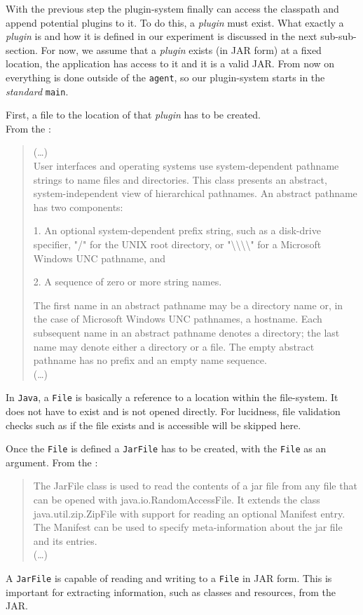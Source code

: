 With the previous step the plugin-system finally can access the classpath and append potential plugins to it.
To do this, a \textit{plugin} must exist.
What exactly a \textit{plugin} is and how it is defined in our experiment is discussed in the next sub-sub-section.
For now, we assume that a \textit{plugin} exists (in JAR form) at a fixed location, the application has access to it and it is a valid JAR.
From now on everything is done outside of the \texttt{agent}, so our plugin-system starts in the \textit{standard} \lstinline{main}.

First, a file to the location of that \textit{plugin} has to be created.\\
From the \textcite{javadoc:file}:
\begin{quote}
    (\dots)
    \\
    User interfaces and operating systems use system-dependent pathname strings to name files and directories. This class presents an abstract, system-independent view of hierarchical pathnames. An abstract pathname has two components:

        1. An optional system-dependent prefix string, such as a disk-drive specifier, "/" for the UNIX root directory, or "\textbackslash\textbackslash\textbackslash\textbackslash" for a Microsoft Windows UNC pathname, and

        2. A sequence of zero or more string names.

    The first name in an abstract pathname may be a directory name or, in the case of Microsoft Windows UNC pathnames, a hostname. Each subsequent name in an abstract pathname denotes a directory; the last name may denote either a directory or a file. The empty abstract pathname has no prefix and an empty name sequence.
    \\
    (\dots)
\end{quote}
In \texttt{Java}, a \lstinline{File} is basically a reference to a location within the file-system.
It does not have to exist and is not opened directly.
For lucidness, file validation checks such as if the file exists and is accessible will be skipped here.

Once the \lstinline{File} is defined a \lstinline{JarFile} has to be created, with the \lstinline{File} as an argument.
From the \textcite{javadoc:jar_file}:
\begin{quote}
    The JarFile class is used to read the contents of a jar file from any file that can be opened with java.io.RandomAccessFile. It extends the class java.util.zip.ZipFile with support for reading an optional Manifest entry. The Manifest can be used to specify meta-information about the jar file and its entries.
    \\
    (\dots)
\end{quote}
A \lstinline{JarFile} is capable of reading and writing to a \lstinline{File} in JAR form.
This is important for extracting information, such as classes and resources, from the JAR.

